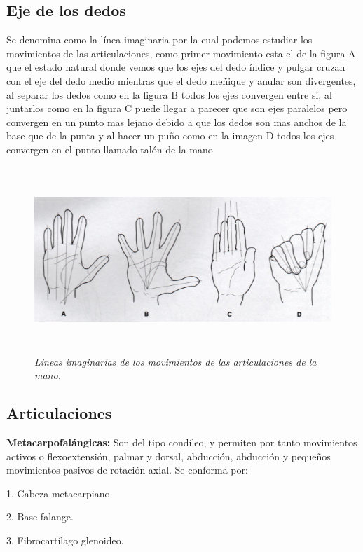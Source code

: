 \documentclass{article}
\begin{document}
\subsection{Eje de los dedos}
Se denomina como la línea imaginaria por la cual podemos estudiar los movimientos de las articulaciones, como primer movimiento esta el de la figura A que el estado natural donde vemos que los ejes del dedo índice y pulgar cruzan con el eje del dedo medio mientras que el dedo meñique y anular son divergentes, al separar los dedos como en la figura B todos los ejes convergen entre si, al juntarlos como en la figura C puede llegar a parecer que son ejes paralelos pero convergen en un punto mas lejano debido a que los dedos son mas anchos de la base que de la punta y al hacer un puño como en la imagen D todos los ejes convergen en el punto llamado talón de la mano
\begin{figure}[H]
    \centering
    \includegraphics[height=7cm]{Imagenes/1.png}
    \caption{\textit{Lineas imaginarias de los movimientos de las articulaciones de la mano.}} %
    \label{exemploLabel}
    \end{figure}

\subsection{Articulaciones}
\textbf{Metacarpofalángicas:} Son del tipo condíleo, y permiten por tanto movimientos activos o flexoextensión, palmar y dorsal, abducción, abducción y pequeños movimientos pasivos de rotación axial.
Se conforma por: 

1.	Cabeza metacarpiano.

2.	Base falange.

3.	Fibrocartílago glenoideo.
\end{document}
